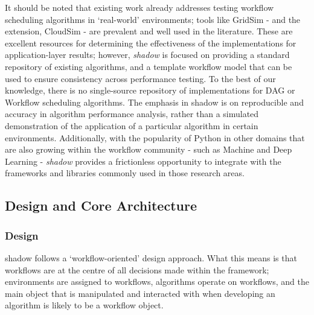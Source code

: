 \documentclass{article}
\begin{document}
\begin{multicols}{2}
It should be noted that existing work already addresses testing workflow scheduling algorithms in `real-world' environments; tools like GridSim - and the extension, CloudSim - are prevalent and well used in the literature. These are excellent resources for determining the effectiveness of the implementations for application-layer results; however, \textit{shadow} is focused on providing a standard repository of existing algorithms, and a template workflow model that can be used to ensure consistency across performance testing. To the best of our knowledge, there is no single-source repository of implementations for DAG or Workflow scheduling algorithms.  The emphasis in shadow is on reproducible and accuracy in algorithm performance analysis, rather than a simulated demonstration of the application of a particular algorithm in certain environments. 
Additionally, with the popularity of Python in other domains that are also growing within the workflow community - such as Machine and Deep Learning - \textit{shadow} provides a frictionless opportunity to integrate with the frameworks and libraries commonly used in those research areas.


\subsection*{Design and Core Architecture}
\label{ssec:danda}

\subsubsection*{Design}
shadow follows a ‘workflow-oriented’ design approach. What this means is that workflows are at the centre of all decisions made within the framework; environments are assigned to workflows, algorithms operate on workflows, and the main object that is manipulated and interacted with when developing an algorithm is likely to be a workflow object. 


\end{multicols}
\end{document}
